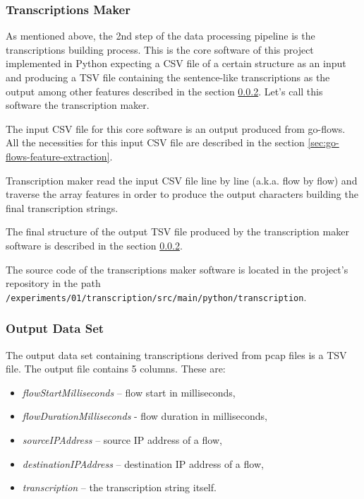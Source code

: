 \documentclass{article}
\begin{document}
\subsubsection{Transcriptions Maker}
As mentioned above, the 2nd step of the data processing pipeline is the transcriptions building process. This is the core software of this project implemented in Python expecting a CSV file of a certain structure as an input and producing a TSV file containing the sentence-like transcriptions as the output among other features described in the section \ref{sec-output-dataset}. Let's call this software the transcription maker.

The input CSV file for this core software is an output produced from go-flows. All the necessities for this input CSV file are described in the section \ref{sec:go-flows-feature-extraction}.

Transcription maker read the input CSV file line by line (a.k.a. flow by flow) and traverse the array features in order to produce the output characters building the final transcription strings.

The final structure of the output TSV file produced by the transcription maker software is described in the section \ref{sec-output-dataset}.

The source code of the transcriptions maker software is located in the project's repository in the path \verb|/experiments/01/transcription/src/main/python/transcription|.


\subsubsection{Output Data Set}\label{sec-output-dataset}

The output data set containing transcriptions derived from pcap files is a TSV file. The output file contains 5 columns. These are:
\begin{itemize}
    \item \textit{flowStartMilliseconds} -- flow start in milliseconds,
    \item \textit{flowDurationMilliseconds} - flow duration in milliseconds,
    \item \textit{sourceIPAddress} -- source IP address of a flow,
    \item \textit{destinationIPAddress} -- destination IP address of a flow,
    \item \textit{transcription} -- the transcription string itself.
\end{itemize}
\end{document}
